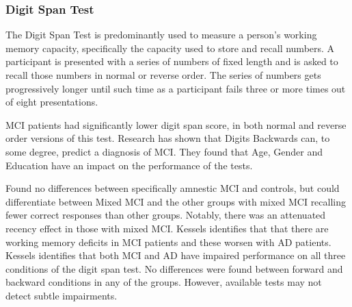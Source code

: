\documentclass[12pt, twoside, a4paper]{article}
\begin{document}
\subsubsection{Digit Span Test}
The Digit Span Test is predominantly used to measure a person's working memory capacity, specifically the capacity used to store and recall numbers. A participant is presented with a series of numbers of fixed length and is asked to recall those numbers in normal or reverse order. The series of numbers gets progressively longer until such time as a participant fails three or more times out of eight presentations.
\par
MCI patients had significantly lower digit span score, in both normal and reverse order versions of this test. Research has shown that Digits Backwards can, to some degree, predict a diagnosis of MCI. They found that Age, Gender and Education have an impact on the performance of the tests.
\par
Found no differences between specifically amnestic MCI and controls, but could differentiate between Mixed MCI and the other groups with mixed MCI recalling fewer correct responses than other groups. Notably, there was an attenuated recency effect in those with mixed MCI.
Kessels identifies that that there are working memory deficits in MCI patients and these worsen with AD patients.
Kessels identifies that both MCI and AD have impaired performance on all three conditions of the digit span test. No differences were found between forward and backward conditions in any of the groups. However, available tests may not detect subtle impairments.
\end{document}
